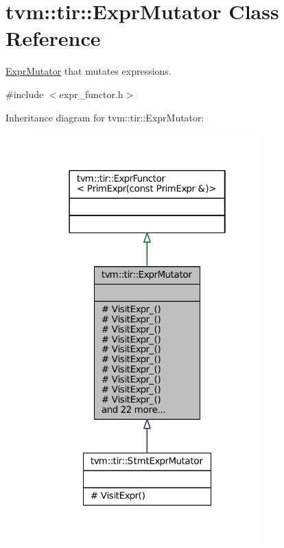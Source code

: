 \hypertarget{classtvm_1_1tir_1_1ExprMutator}{}\section{tvm\+:\+:tir\+:\+:Expr\+Mutator Class Reference}
\label{classtvm_1_1tir_1_1ExprMutator}


\hyperlink{classtvm_1_1tir_1_1ExprMutator}{Expr\+Mutator} that mutates expressions.  




{\ttfamily \#include $<$expr\+\_\+functor.\+h$>$}



Inheritance diagram for tvm\+:\+:tir\+:\+:Expr\+Mutator\+:
\nopagebreak
\begin{figure}[H]
\begin{center}
\leavevmode
\includegraphics[width=250pt]{classtvm_1_1tir_1_1ExprMutator__inherit__graph}
\end{center}
\end{figure}


